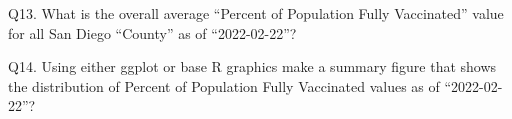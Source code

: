 \documentclass[
]{article}
\newenvironment{Shaded}{\begin{snugshade}}{\end{snugshade}}
\newcommand{\FunctionTok}[1]{\textcolor[rgb]{0.00,0.00,0.00}{#1}}
\newcommand{\NormalTok}[1]{#1}
\newcommand{\OtherTok}[1]{\textcolor[rgb]{0.56,0.35,0.01}{#1}}
\newcommand{\SpecialCharTok}[1]{\textcolor[rgb]{0.00,0.00,0.00}{#1}}
\begin{document}
Q13. What is the overall average ``Percent of Population Fully
Vaccinated'' value for all San Diego ``County'' as of ``2022-02-22''?

\begin{Shaded}
\end{Shaded}

Q14. Using either ggplot or base R graphics make a summary figure that
shows the distribution of Percent of Population Fully Vaccinated values
as of ``2022-02-22''?
\end{document}
